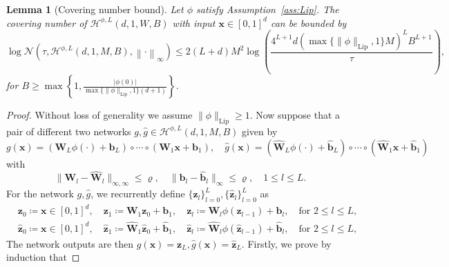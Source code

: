 \documentclass[10pt,a4paper]{amsart}
\newtheorem{lemma}{Lemma}
\newcommand{\bW}{\fbf{W}}
\newcommand{\bb}{\fbf{b}}
\newcommand{\bx}{\fbf{x}}
\newcommand{\bz}{\fbf{z}}
\newcommand{\fbf}[1]{\boldsymbol{#1}}
\renewcommand{\ge}{\geqslant}
\renewcommand{\geq}{\ge}
\renewcommand{\le}{\leqslant}
\renewcommand{\leq}{\le}
\begin{document}
\begin{lemma}[Covering number bound]
    Let $\phi$ satisfy Assumption~\ref{ass:Lip}.  The covering number of $\mathcal{H}^{\phi,L}(d, 1, W, B)$ with input $\bx \in [0,1]^d$
    can be bounded by 
    \begin{equation}
        \log \mathcal{N}(\tau, \mathcal{H}^{\phi,L}(d, 1, M, B), \left\|\cdot\right\|_\infty) \leq 2 (L + d) M^2 \log \left( \frac{4^{L+1} d( \max \{\|\phi\|_{\mathrm{Lip}},1 \} M)^{L} B^{L+1}}{\tau}\right),
        \label{eq:covering_entropy_bound}
    \end{equation}
    for $B \geq \max \left\{ 1, \frac{|\phi(0)|}{\max\{\|\phi\|_{\mathrm{Lip}},1\}(d+1)}\right\}$.
    \label{lem:covering_number}
\end{lemma}

\begin{proof}
    Without loss of generality we assume $\|\phi\|_{\mathrm{Lip}} \ge 1$.
    Now suppose that a pair of different two networks $g, \widehat{g} \in \mathcal{H}^{\phi,L}(d, 1, M,B)$ given by 
    \begin{equation*}
        g(\bx) = (\bW_{L} \phi(\cdot) + \bb_{L}) \circ \cdots \circ (\bW_1 \bx + \bb_{1}), \quad \widehat{g}(\bx) = (\widehat{\bW}_{L} \phi(\cdot) + \widehat{\bb}_{L}) \circ \cdots \circ (\widehat{\bW}_1 \bx + \widehat{\bb}_{1})
    \end{equation*}
    with
    \begin{equation*}
        \|\bW_{l} - \widehat{\bW}_l\|_{\infty, \infty} \leq \varrho, \quad \|\bb_l - \widehat{\bb}_l\|_{\infty} \leq \varrho, \quad 1 \leq l \leq L.
    \end{equation*}
    For the network $g, \widehat{g}$, we recurrently define $\{\bz_l\}_{l=0}^L, \{\widehat{\bz}_l\}_{l=0}^L$ as 
    \begin{equation*}
        \begin{aligned}
            & {\bz}_0 \coloneqq  \bx \in [0,1]^d, \quad \bz_1 \coloneqq  \bW_1 \bz_0 + \bb_1, \quad  \bz_l \coloneqq  \bW_l \phi(\bz_{l-1}) + \bb_l, \quad \text{for } 2 \le l \le L, \\
            & \widehat{\bz}_0 \coloneqq  \bx \in [0,1]^d, \quad \widehat{\bz}_1 \coloneqq  \widehat{\bW}_1 \widehat{\bz}_0 + \widehat{\bb}_1, \quad  \widehat{\bz}_l \coloneqq  \widehat{\bW}_l \phi(\widehat{\bz}_{l-1}) + \widehat{\bb}_l, \quad \text{for } 2 \le l \le L,
        \end{aligned}
    \end{equation*}
    The network outputs are then $g(\bx) = \bz_L, \widehat{g}(\bx) = \widehat{\bz}_L$. Firstly, we prove by induction that 

\end{proof}
\end{document}
